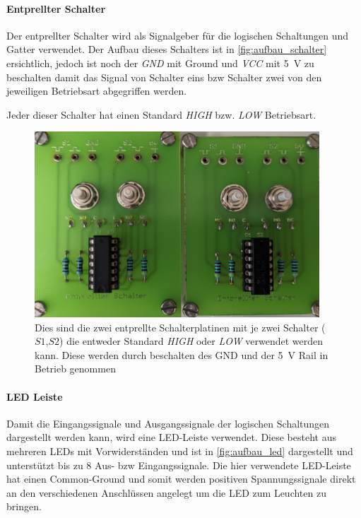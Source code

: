 \documentclass[12pt,english,ngerman]{scrartcl}
\begin{document}
\paragraph{Entprellter Schalter}\label{sec:schalter_aufbau}
Der entprellter Schalter wird als Signalgeber für die logischen Schaltungen und
Gatter verwendet. Der Aufbau dieses Schalters ist in
\autoref{fig:aufbau_schalter} ersichtlich, jedoch ist noch der \textit{GND} mit
Ground und \textit{VCC} mit \SI{5}{\volt} zu beschalten damit das Signal von
Schalter eins bzw Schalter zwei von den jeweiligen Betriebsart abgegriffen
werden.

Jeder dieser Schalter hat einen Standard \textit{HIGH} bzw.
\textit{LOW} Betriebsart.

\begin{figure}[H]
  \centering
    \includegraphics[width=0.95\textwidth]{./figures/messungen/schalter.jpg}
  \caption{Dies sind die zwei entprellte Schalterplatinen mit je zwei Schalter
    ($S1$,$S2$) die entweder Standard \textit{HIGH} oder \textit{LOW} verwendet
    werden kann. Diese werden durch beschalten des GND und der \SI{5}{\volt}
    Rail in Betrieb genommen}
  \label{fig:aufbau_schalter}
\end{figure}


\paragraph{LED Leiste}
Damit die Eingangssignale und Ausgangssignale der logischen Schaltungen
dargestellt werden kann, wird eine LED-Leiste verwendet. Diese besteht aus
mehreren LEDs mit Vorwiderständen und ist in \autoref{fig:aufbau_led} dargestellt und
unterstützt bis zu 8 Aus- bzw Eingangssignale. Die hier verwendete LED-Leiste
hat einen Common-Ground und somit werden positiven Spannungssignale direkt an den
verschiedenen Anschlüssen angelegt um die LED zum Leuchten zu bringen.
\end{document}
